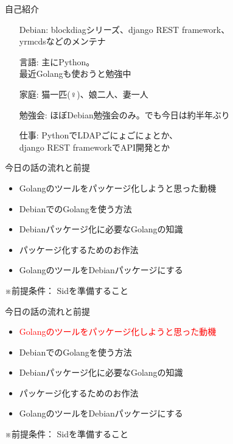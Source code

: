 
\frame{\titlepage{}}

\begin{frame}{自己紹介}
 \begin{itemize}
  \item[Debian:] blockdiagシリーズ、django REST framework、\\yrmcdsなどのメンテナ
  \item[言語:] 主にPython。\\最近Golangも使おうと勉強中
  \item[家庭:] 猫一匹(♀)、娘二人、妻一人
  \item[勉強会:] ほぼDebian勉強会のみ。でも今日は約半年ぶり
  \item[仕事:] PythonでLDAPごにょごにょとか、\\django REST frameworkでAPI開発とか
 \end{itemize}
\end{frame}

\begin{frame}{今日の話の流れと前提}
\begin{itemize}
  \item Golangのツールをパッケージ化しようと思った動機
  \item DebianでのGolangを使う方法
  \item Debianパッケージ化に必要なGolangの知識
  \item パッケージ化するためのお作法
  \item GolangのツールをDebianパッケージにする
\end{itemize}

※前提条件： Sidを準備すること
\end{frame}


\begin{frame}{今日の話の流れと前提}
\begin{itemize}
  \item \textcolor{red}{Golangのツールをパッケージ化しようと思った動機}
  \item DebianでのGolangを使う方法
  \item Debianパッケージ化に必要なGolangの知識
  \item パッケージ化するためのお作法
  \item GolangのツールをDebianパッケージにする
\end{itemize}

※前提条件： Sidを準備すること
\end{frame}

